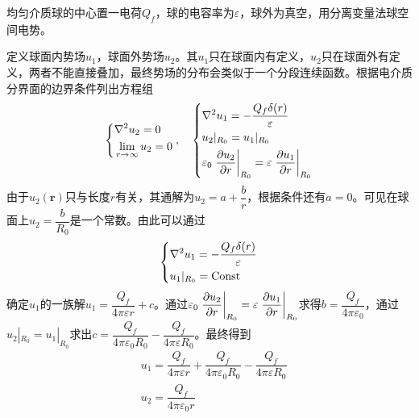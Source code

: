 \documentclass{mynote}
\begin{document}
\begin{exercise}{2.3}
    均匀介质球的中心置一电荷$Q_f$，球的电容率为$\varepsilon$，球外为真空，用分离变量法球空间电势。
\end{exercise}
\begin{solution}
    定义球面内势场$u_1$，球面外势场$u_2$。其$u_1$只在球面内有定义，$u_2$只在球面外有定义，两者不能直接叠加，最终势场的分布会类似于一个分段连续函数。根据电介质分界面的边界条件列出方程组
    \[
        \left\{
        \begin{aligned}
            & \nabla^2 u_2 = 0 \\
            & \lim_{r \to \infty} u_2 = 0
        \end{aligned} 
    \right.  
     ,\quad 
     \left\{
        \begin{aligned}
            & \nabla^2 u_1 = - \frac{Q_f\delta(r)}{\varepsilon} \\
            & u_2|_{R_0} = u_1|_{R_0} \\
            & \varepsilon_0 \left. \dfrac{\partial u_2}{\partial r} \right|_{R_0} = \varepsilon \left. \dfrac{\partial u_1}{\partial r} \right|_{R_0} \\
        \end{aligned} 
    \right.
    \]
    由于$u_2(\bm{r})$只与长度$r$有关，其通解为$u_2 = a + \dfrac{b}{r}$，根据条件还有$a = 0$。可见在球面上$u_2 = \dfrac{b}{R_0}$是一个常数。由此可以通过
    \[
        \left\{
            \begin{aligned}
                & \nabla^2 u_1 = - \frac{Q_f\delta(r)}{\varepsilon} \\
                & u_1|_{R_0} = \mathrm{Const}
            \end{aligned} 
        \right.
    \]
    确定$u_1$的一族解$u_1 = \dfrac{Q_f}{4\pi \varepsilon r} + c$。通过$ \varepsilon_0 \left. \dfrac{\partial u_2}{\partial r} \right|_{R_0} = \varepsilon \left. \dfrac{\partial u_1}{\partial r} \right|_{R_0}$求得$b = \dfrac{Q_f}{4\pi \varepsilon_0}$，通过$u_2|_{R_0} = u_1|_{R_0}$求出$c = \dfrac{Q_f}{4\pi \varepsilon_0 R_0} - \dfrac{Q_f}{4\pi \varepsilon R_0}$。最终得到
    \begin{align*}
        & u_1 = \dfrac{Q_f}{4\pi \varepsilon r} + \dfrac{Q_f}{4\pi \varepsilon_0 R_0} - \dfrac{Q_f}{4\pi \varepsilon R_0} \\
        & u_2 = \dfrac{Q_f}{4\pi \varepsilon_0 r }
    \end{align*}

\end{solution}
\end{document}
